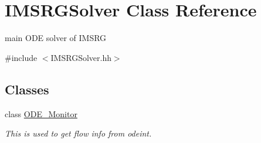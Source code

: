 \hypertarget{classIMSRGSolver}{}\section{I\+M\+S\+R\+G\+Solver Class Reference}
\label{classIMSRGSolver}


main O\+DE solver of I\+M\+S\+RG  




{\ttfamily \#include $<$I\+M\+S\+R\+G\+Solver.\+hh$>$}

\subsection*{Classes}
\begin{DoxyCompactItemize}
\item 
class \hyperlink{classIMSRGSolver_1_1ODE__Monitor}{O\+D\+E\+\_\+\+Monitor}
\begin{DoxyCompactList}\small\item\em This is used to get flow info from odeint. \end{DoxyCompactList}\end{DoxyCompactItemize}
